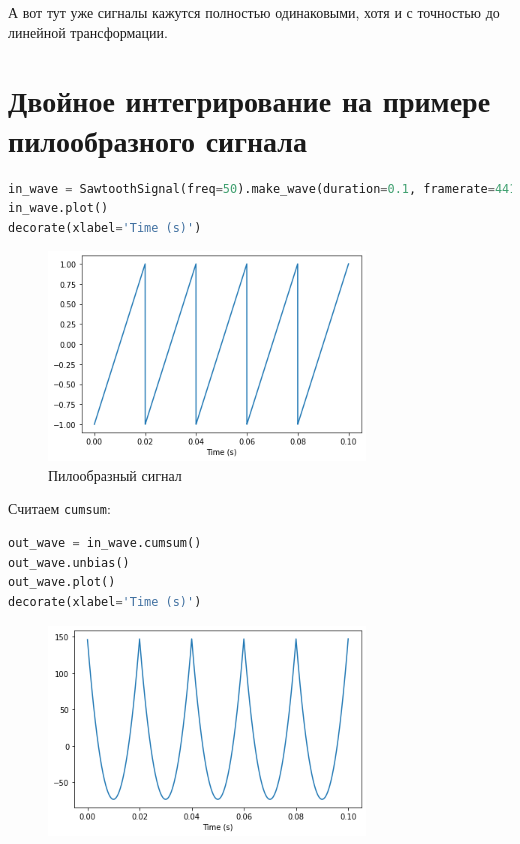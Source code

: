 \documentclass[a4paper,12pt]{report}
\begin{document}
    А вот тут уже сигналы кажутся полностью одинаковыми, хотя и с точностью до линейной трансформации.
    
    \chapter{Двойное интегрирование на примере пилообразного сигнала}
    
\begin{lstlisting}[language=Python,caption=Пилообразный сигнал]
in_wave = SawtoothSignal(freq=50).make_wave(duration=0.1, framerate=44100)
in_wave.plot()
decorate(xlabel='Time (s)')
\end{lstlisting}

    \begin{figure}[H]
        \centering
        \includegraphics[width=0.75\textwidth]{ex3_in_wave.png}
        \caption{Пилообразный сигнал}
        \label{fig:ex3_in_wave}
    \end{figure}

    Считаем \texttt{cumsum}:
    
\begin{lstlisting}[language=Python,caption=\textquote{Просуммированный}]
out_wave = in_wave.cumsum()
out_wave.unbias()
out_wave.plot()
decorate(xlabel='Time (s)')
\end{lstlisting}

    \begin{figure}[H]
        \centering
        \includegraphics[width=0.75\textwidth]{ex3_out_wave.png}
        \caption{}
        \label{fig:ex3_out_wave}
    \end{figure}
\end{document}
